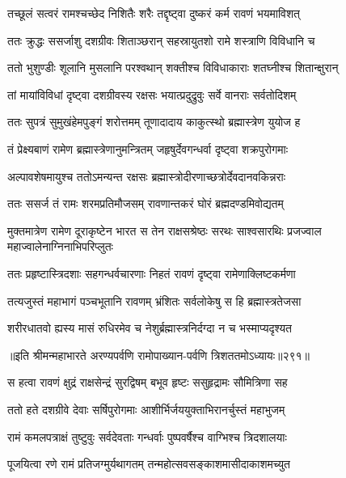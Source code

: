 \twolineshloka
{तच्छूलं सत्वरं रामश्चच्छेद निशितैः शरैः}
{तद्दृष्ट्वा दुष्करं कर्म रावणं भयमाविशत्}


\twolineshloka
{ततः क्रुद्धः ससर्जाशु दशग्रीवः शिताञ्छरान्}
{सहस्रायुतशो रामे शस्त्राणि विविधानि च}


\twolineshloka
{ततो भुशुण्डीः शूलानि मुसलानि परश्वथान्}
{शक्तीश्च विविधाकाराः शतघ्नीश्च शितान्क्षुरान्}


\twolineshloka
{तां मायांविविधां दृष्ट्वा दशग्रीवस्य रक्षसः}
{भयात्प्रदुद्रुवुः सर्वे वानराः सर्वतोदिशम्}


\twolineshloka
{ततः सुपत्रं सुमुखंहेमपुङ्गं शरोत्तमम्}
{तूणादादाय काकुत्स्थो ब्रह्मास्त्रेण युयोज ह}


\twolineshloka
{तं प्रेक्ष्यबाणं रामेण ब्रह्मास्त्रेणानुमन्त्रितम्}
{जहृषुर्देवगन्धर्वा दृष्ट्वा शक्रपुरोगमाः}


\twolineshloka
{अल्पावशेषमायुश्च ततोऽमन्यन्त रक्षसः}
{ब्रह्मास्त्रोदीरणाच्छत्रोर्देवदानवकिन्नराः}


\twolineshloka
{ततः ससर्ज तं रामः शरमप्रतिमौजसम्}
{रावणान्तकरं घोरं ब्रह्मदण्डमिवोद्यतम्}


\threelineshloka
{मुक्तमात्रेण रामेण दूराकृष्टेन भारत}
{स तेन राक्षसश्रेष्ठः सरथः साश्वसारथिः}
{प्रजज्वाल महाज्वालेनाग्निनाभिपरिप्लुतः}


\twolineshloka
{ततः प्रहृष्टास्त्रिदशाः सहगन्धर्वचारणाः}
{निहतं रावणं दृष्ट्वा रामेणाक्लिष्टकर्मणा}


\twolineshloka
{तत्यजुस्तं महाभागं पञ्चभूतानि रावणम्}
{भ्रंशितः सर्वलोकेषु स हि ब्रह्मास्त्रतेजसा}


\twolineshloka
{शरीरधातवो ह्यस्य मासं रुधिरमेव च}
{नेशुर्ब्रह्मास्त्रनिर्दग्दा न च भस्माप्यदृश्यत}


॥इति श्रीमन्महाभारते अरण्यपर्वणि रामोपाख्यान-पर्वणि त्रिशततमोऽध्यायः॥२९१॥

\storymeta

\resetShloka



\twolineshloka
{स हत्वा रावणं क्षुद्रं राक्षसेन्द्रं सुरद्विषम्}
{बभूव हृष्टः ससुहृद्रामः सौमित्रिणा सह}


\twolineshloka
{ततो हते दशग्रीवे देवाः सर्षिपुरोगमाः}
{आशीर्भिर्जययुक्ताभिरानर्चुस्तं महाभुजम्}


\twolineshloka
{रामं कमलपत्राक्षं तुष्टुवुः सर्वदेवताः}
{गन्धर्वाः पुष्पवर्षैश्च वाग्भिश्च त्रिदशालयाः}


\twolineshloka
{पूजयित्वा रणे रामं प्रतिजग्मुर्यथागतम्}
{तन्महोत्सवसङ्काशमासीदाकाशमच्युत}


